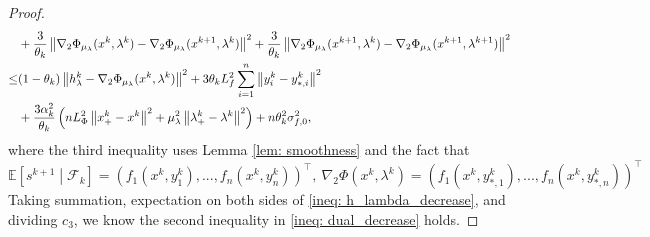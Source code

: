 \documentclass[10pt]{article}
\theoremstyle{remark}
\def\setF{\mathscr{F}} %
\newcommand{\E}{\mathbb{E}}
\newcommand{\norm}[1]{\left\|#1\right\|}
\newcommand{\T}{^\top}
\begin{document}
\begin{proof}
\begin{align}
        & + \frac{3}{\theta_k}\norm{\nabla_2\Phi_{\mu_{\lambda}}(x^k, \lambda^k) - \nabla_2\Phi_{\mu_{\lambda}}(x^{k+1}, \lambda^{k})}^2 + \frac{3}{\theta_k}\norm{\nabla_2\Phi_{\mu_{\lambda}}(x^{k+1}, \lambda^k) - \nabla_2\Phi_{\mu_{\lambda}}(x^{k+1}, \lambda^{k+1})}^2 \notag\\
        \leq &(1 - \theta_k)\norm{h_{\lambda}^k - \nabla_2\Phi_{\mu_{\lambda}}(x^k, \lambda^k)}^2 + 3\theta_kL_f^2\sum_{i=1}^{n}\norm{y_i^k - y_{*,i}^k}^2\notag \\
        & + \frac{3\alpha_k^2}{\theta_k}\left(nL_{\Phi}^2\norm{x_+^k - x^k}^2 + \mu_{\lambda}^2\norm{\lambda_+^k - \lambda^k}^2\right) + n\theta_k^2\sigma_{f,0}^2,\label{ineq: h_lambda_decrease}
\end{align}
where the third inequality uses Lemma \ref{lem: smoothness} and the fact that
\[
    \E\left[s^{k+1}\middle|\setF_k\right] = \left(f_1(x^k, y_1^k), ..., f_n(x^k, y_n^k)\right)\T,\ \nabla_2\Phi(x^k,\lambda^k) = \left(f_1(x^k, y_{*,1}^k), ..., f_n(x^k, y_{*,n}^k)\right)\T
\]
Taking summation, expectation on both sides of \eqref{ineq: h_lambda_decrease}, and dividing $c_3$, we know the second inequality in \eqref{ineq: dual_decrease} holds.
\end{proof}
\end{document}

